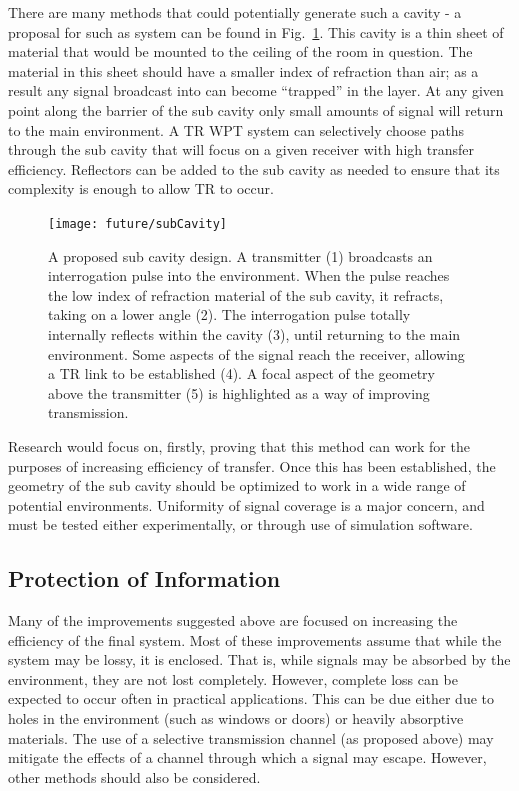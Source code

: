 There are many methods that could potentially generate such a cavity - a proposal for such as system can be found in Fig.~\ref{fig:subCav}. This cavity is a thin sheet of material that would be mounted to the ceiling of the room in question. The material in this sheet should have a smaller index of refraction than air; as a result any signal broadcast into can become ``trapped'' in the layer. At any given point along the barrier of the sub cavity only small amounts of signal will return to the main environment. A TR WPT system can selectively choose paths through the sub cavity that will focus on a given receiver with high transfer efficiency. Reflectors can be added to the sub cavity as needed to ensure that its complexity is enough to allow TR to occur.

\begin{figure}[h]
\texttt{[image: future/subCavity]}
\caption[Proposed ``Sub Cavity Design'']{A proposed sub cavity design. A transmitter (1) broadcasts an interrogation pulse into the environment. When the pulse reaches the low index of refraction material of the sub cavity, it refracts, taking on a lower angle (2). The interrogation pulse totally internally reflects within the cavity (3), until returning to the main environment. Some aspects of the signal reach the receiver, allowing a TR link to be established (4). A focal aspect of the geometry above the transmitter (5) is highlighted as a way of improving transmission.}
\label{fig:subCav}
\end{figure}

Research would focus on, firstly, proving that this method can work for the purposes of increasing efficiency of transfer. Once this has been established, the geometry of the sub cavity should be optimized to work in a wide range of potential environments. Uniformity of signal coverage is a major concern, and must be tested either experimentally, or through use of simulation software.

\subsection{Protection of Information}
Many of the improvements suggested above are focused on increasing the efficiency of the final system. Most of these improvements assume that while the system may be lossy, it is enclosed. That is, while signals may be absorbed by the environment, they are not lost completely. However, complete loss can be expected to occur often in practical applications. This can be due either due to holes in the environment (such as windows or doors) or heavily absorptive materials. The use of a selective transmission channel (as proposed above) may mitigate the effects of a channel through which a signal may escape. However, other methods should also be considered.

